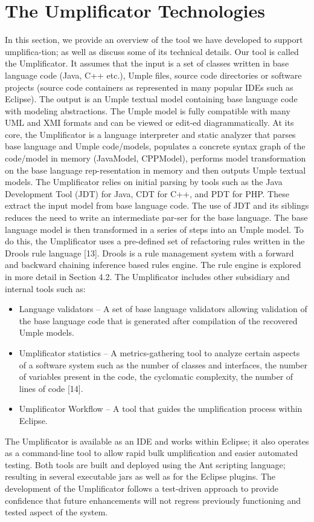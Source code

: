 \lhead{\emph{\leftmark}}  %
\chapter{The Umplificator Technologies}
In this section, we provide an overview of the tool we have developed to support umplifica-tion; as well as discuss some of its technical details.
Our tool is called the Umplificator. It assumes that the input is a set of classes written in base language code (Java, C++ etc.), Umple files, source code directories or software projects (source code containers as represented in many popular IDEs such as Eclipse). The output is an Umple textual model containing base language code with modeling abstractions. The Umple model is fully compatible with many UML and XMI formats and can be viewed or edit-ed diagrammatically. 
At its core, the Umplificator is a language interpreter and static analyzer that parses base language and Umple code/models, populates a concrete syntax graph of the code/model in memory (JavaModel, CPPModel), performs model transformation on the base language rep-resentation in memory and then outputs Umple textual models.
The Umplificator relies on initial parsing by tools such as the Java Development Tool (JDT) for Java, CDT for C++, and PDT for PHP. These extract the input model from base language code. The use of JDT and its siblings reduces the need to write an intermediate par-ser for the base language.
The base language model is then transformed in a series of steps into an Umple model. To do this, the Umplificator uses a pre-defined set of refactoring rules written in the Drools rule language [13]. Drools is a rule management system with a forward and backward chaining inference based rules engine. The rule engine is explored in more detail in Section 4.2. 
The Umplificator includes other subsidiary and internal tools such as:
\begin{itemize}
\item Language validators – A set of base language validators allowing validation of the base language code that is generated after compilation of the recovered Umple models.
\item Umplificator statistics –  A metrics-gathering tool to analyze certain aspects of a software system such as the number of classes and interfaces, the  number of variables present in the code, the cyclomatic complexity, the number of lines of code [14].  
\item Umplificator Workflow – A tool that guides the umplification process within Eclipse.
\end{itemize}
The Umplificator is available as an IDE and works within Eclipse; it also operates as a command-line tool to allow rapid bulk umplification and easier automated testing. Both tools are built and deployed using the Ant scripting language; resulting in several executable jars as well as for the Eclipse plugins. 
The development of the Umplificator follows a test-driven approach to provide confidence that future enhancements will not regress previously functioning and tested aspect of the system. 

